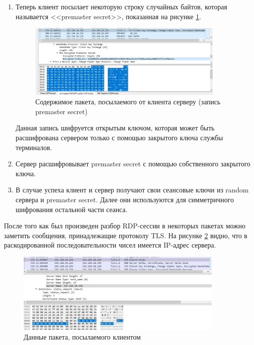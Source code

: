 \documentclass[bachelor, och, coursework]{SCWorks}
\begin{document}
\begin{enumerate}
    \item Теперь клиент посылает некоторую строку случайных байтов, которая называется <<premaster secret>>, показанная на рисунке \ref{cert1}. 
    
    \begin{figure}[H]
      \centering
      \includegraphics[width=0.9\textwidth]{photo/cert1.png}
      \caption{Содержимое пакета, посылаемого от клиента серверу (запись premaster secret)}
      \label{cert1}
    \end{figure}
    
    Данная запись шифруется открытым ключом, которая может быть расшифрована сервером только с помощью закрытого ключа службы терминалов.
    \item Сервер расшифровывает premaster secret с помощью собственного закрытого ключа.
    \item В случае успеха клиент и сервер получают свои сеансовые ключи из random сервера и premaster secret. Далее они используются для симметричного 
    шифрования остальной части сеанса.
  \end{enumerate}

  После того как был произведен разбор RDP-сессии в некоторых пакетах можно заметить сообщения, принадлежащие протоколу TLS.
  На рисунке \ref{clnt-hello} видно, что в раскодированной последовательности чисел имеется IP-адрес сервера.

  \begin{figure}[H]
    \centering
    \includegraphics[width=0.9\textwidth]{photo/clnt-hello.jpg}
    \caption{Данные пакета, посылаемого клиентом}
    \label{clnt-hello}
  \end{figure}  
\end{document}
